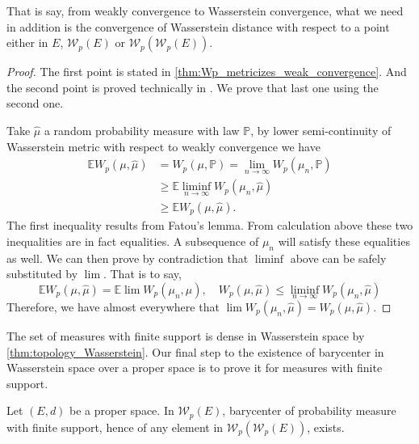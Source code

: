 That is say,
from weakly convergence to Wasserstein convergence,
what we need in addition is the convergence of Wasserstein distance with respect to a point
either in $E$, $\mathcal{W}_p(E)$ or $\mathcal{W}_p(\mathcal{W}_p(E))$.

\begin{proof}
	The first point is stated in \cref{thm:Wp_metricizes_weak_convergence}.
	And	the second point is proved technically in \cite[Lemma 14]{le2017existence}.
	We prove that last one using the second one.

	Take $\hat{\mu}$ a random probability measure with law $\mathbb{P}$,
	by lower semi-continuity of Wasserstein metric with respect to weakly convergence we have
	\begin{align*}
		\mathbb{E}W_p(\mu, \hat{\mu}) & =W_p(\mu, \mathbb{P})=\lim_{n \rightarrow \infty} W_p(\mu_n, \mathbb{P}) \\
		                              & \geq \mathbb{E}\liminf_{n \rightarrow \infty} W_p(\mu_n, \hat{\mu})      \\
		                              & \geq \mathbb{E}W_p(\mu, \hat{\mu}).
	\end{align*}
	The first inequality results from Fatou's lemma.
	From calculation above these two inequalities are in fact equalities.
	A subsequence of $\mu_n$ will satisfy these equalities as well.
	We can then prove by contradiction that $\liminf$ above can be safely substituted by $\lim$.
	That is to say,
	\[
		\mathbb{E}W_p(\mu, \hat{\mu}) = \mathbb{E}\lim W_p(\mu_n, \hat{\mu}),
		\quad W_p(\mu, \hat{\mu}) \leq \liminf_{n \rightarrow \infty} W_p(\mu_n, \hat{\mu})
	\]
	Therefore, we have almost everywhere that $\lim W_p(\mu_n, \hat{\mu})=W_p(\mu, \hat{\mu})$.
\end{proof}

The set of measures with finite support is dense in Wasserstein space by \cref{thm:topology_Wasserstein}.
Our final step to the existence of barycenter in Wasserstein space over a proper space
is to prove it for measures with finite support.

\begin{thm}
	\label{thm:barycenter_finite_support_measure}
	Let $(E,d)$ be a proper space.
	In $\mathcal{W}_p(E)$, barycenter of probability measure with finite support,
	hence of any element in $\mathcal{W}_p(\mathcal{W}_p(E))$,
	exists.
\end{thm}

